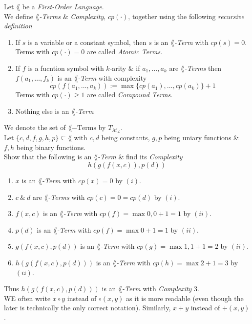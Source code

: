 \documentclass[11pt,a4paper]{article}
\begin{document}
Let $\lang$ be a \textit{First-Order Language}.\\
We define \textit{$\lang$-Terms} \& \textit{Complexity}, $cp(\cdot)$, together using the following \textit{recursive definition}
\begin{enumerate}
	\item If $s$ is a variable or a constant symbol, then $s$ is an \textit{$\lang$-Term} with $cp(s)=0$.\\
	\nb Terms with $cp(\cdot)=0$ are called \textit{Atomic Terms}.
	\item If $f$ is a fucntion symbol with $k$-arity \& if $a_1,\dots,a_k$ are \textit{$\lang$-Terms} then $f(a_1,\dots,f_k)$ is an \textit{$\lang$-Term} with complexity
	$$cp(f(a_1,\dots,a_k)):=\max\{cp(a_1),\dots,cp(a_k)\}+1$$
	\nb Terms with $cp(\cdot)\geq1$ are called \textit{Compound Terms}.
	\item Nothing else is an \textit{$\lang$-Term}
\end{enumerate}
\nb We denote the set of $\lang-\text{Terms}$ by $T_\mathcal{M_L}$.\\

Let $\{c,d,f,g,h,p\}\subseteq\lang$ with $c,d$ being constants, $g,p$ being uniary functions \& $f,h$ being binary functions.\\
Show that the following is an $\lang$\textit{-Term} \& find its \textit{Complexity}
$$h(g(f(x,c)),p(d))$$
\begin{enumerate}
	\item $x$ is an $\lang$\textit{-Term} with $cp(x)=0$ by $(i)$.
	\item $c\ \&\ d$ are $\lang$\textit{-Terms} with $cp(c)=0=cp(d)$ by $(i)$.
	\item $f(x,c)$ is an $\lang$\textit{-Term} with $cp(f)=\max{0,0}+1=1$ by $(ii)$.
	\item $p(d)$ is an $\lang$\textit{-Term} with $cp(f)=\max{0}+1=1$ by $(ii)$.
	\item $g(f(x,c),p(d))$ is an $\lang$\textit{-Term} with $cp(g)=\max{1,1}+1=2$ by $(ii)$.
	\item $h(g(f(x,c),p(d)))$ is an $\lang$\textit{-Term} with $cp(h)=\max{2}+1=3$ by $(ii)$.
\end{enumerate}
Thus $h(g(f(x,c),p(d)))$ is an $\lang$\textit{-Term} with \textit{Complexity} 3.\\

WE often write $x\circ y$ instead of $\circ(x,y)$ as it is more readable (even though the later is technically the only correct notation). Similarly, $x+y$ instead of $+(x,y)$.\\
\end{document}
